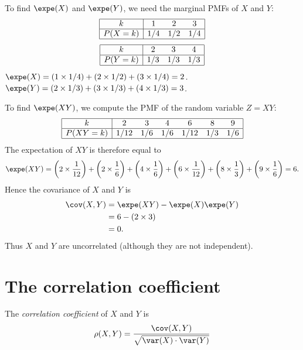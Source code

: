 \begin{solution}
To find $\expe(X)$ and $\expe(Y)$, we need the marginal PMFs of $X$ and $Y$:
\[\begin{array}{|c|ccc|}\hline
k		& 1		& 2		& 3		\\ \hline
P(X=k)	& 1/4	& 1/2	& 1/4	\\ \hline
\end{array}\]
\[\begin{array}{|c|ccc|}\hline
k		& 2		& 3		& 4		\\ \hline
P(Y=k)	& 1/3	& 1/3	& 1/3	\\ \hline
\end{array}\]
\bit
\it $\expe(X) = \left(1\times 1/4\right) + \left(2\times 1/2\right) + \left(3\times 1/4\right) = 2$.
\it $\expe(Y) = \left(2\times 1/3\right) + \left(3\times 1/3\right) + \left(4\times 1/3\right) = 3$.
\eit

To find $\expe(XY)$, we compute the PMF of the random variable $Z=XY$:
\[\begin{array}{|c|cccccc|}\hline
k		& 2		& 3		& 4		& 6		& 8		& 9	\\ \hline
P(XY=k)	& 1/12	& 1/6	& 1/6	& 1/12	& 1/3	& 1/6 \\ \hline
\end{array}\]
The expectation of $XY$ is therefore equal to
\[
\expe(XY) = \left(2\times\frac{1}{12}\right) + \left(2\times\frac{1}{6}\right) + \left(4\times\frac{1}{6}\right) + \left(6\times\frac{1}{12}\right) + \left(8\times\frac{1}{3}\right) + \left(9\times\frac{1}{6}\right) = 6.
\]
Hence the covariance of $X$ and $Y$ is
\begin{align*}
\cov(X,Y)
	& =\expe(XY)-\expe(X)\expe(Y) \\
	& = 6 - (2\times 3) \\
	& = 0.
\end{align*}
Thus $X$ and $Y$ are uncorrelated (although they are not independent).
\end{solution}

\section{The correlation coefficient}

\begin{definition}
The \emph{correlation coefficient} of $X$ and $Y$ is 
\[
\rho(X,Y) = \frac{\cov(X,Y)}{\sqrt{\var(X)\cdot\var(Y)}}
\]
\end{definition}

